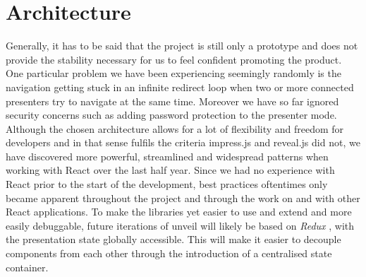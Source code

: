 \section{Architecture}
\label{sec:discussion-architecture}

Generally, it has to be said that the project is still only a prototype and does not provide the stability necessary for us to feel confident promoting the product. One particular problem we have been experiencing seemingly randomly is the navigation getting stuck in an infinite redirect loop when two or more connected presenters try to navigate at the same time. Moreover we have so far ignored security concerns such as adding password protection to the presenter mode.
Although the chosen architecture allows for a lot of flexibility and freedom for developers and in that sense fulfils the criteria impress.js and reveal.js did not, we have discovered more powerful, streamlined and widespread patterns when working with React over the last half year. Since we had no experience with React prior to the start of the development, best practices oftentimes only became apparent throughout the project and through the work on and with other React applications. To make the libraries yet easier to use and extend and more easily debuggable, future iterations of unveil will likely be based on \emph{Redux} \cite{redux}, with the presentation state globally accessible. This will make it easier to decouple components from each other through the introduction of a centralised state container.